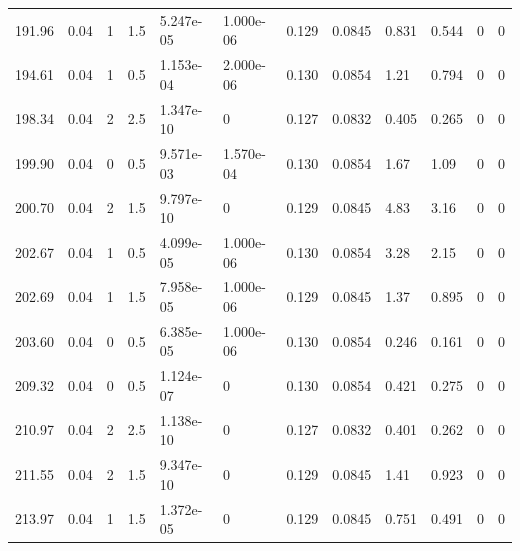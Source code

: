 \documentclass[preview]{standalone}
\begin{document}
{{{\begin{tabular}{L{1.2cm}C{1.2cm} C{0.3cm}C{0.5cm} C{1.4cm}C{1.4cm} C{1.4cm}C{1.4cm} C{1.6cm}C{1.6cm} C{1.6cm}C{1.6cm}}
  191.96  &  0.04  & 1     & 1.5 &  5.247e-05  & 1.000e-06  &  0.129&   0.0845& 0.831 & 0.544   &  0 & 0  \\ 
  194.61  &  0.04  & 1     & 0.5 &  1.153e-04  & 2.000e-06  &  0.130&   0.0854& 1.21 & 0.794   &  0 & 0  \\ 
  198.34  &  0.04  & 2     & 2.5 &  1.347e-10  & 0  &  0.127&   0.0832& 0.405 & 0.265   &  0 & 0  \\ 
  199.90  &  0.04  & 0     & 0.5 &  9.571e-03  & 1.570e-04  &  0.130&   0.0854& 1.67 & 1.09   &  0 & 0  \\ 
  200.70  &  0.04  & 2     & 1.5 &  9.797e-10  & 0  &  0.129&   0.0845& 4.83 & 3.16   &  0 & 0  \\ 
  202.67  &  0.04  & 1     & 0.5 &  4.099e-05  & 1.000e-06  &  0.130&   0.0854& 3.28 & 2.15   &  0 & 0  \\ 
  202.69  &  0.04  & 1     & 1.5 &  7.958e-05  & 1.000e-06  &  0.129&   0.0845& 1.37 & 0.895   &  0 & 0  \\ 
  203.60  &  0.04  & 0     & 0.5 &  6.385e-05  & 1.000e-06  &  0.130&   0.0854& 0.246 & 0.161   &  0 & 0  \\ 
  209.32  &  0.04  & 0     & 0.5 &  1.124e-07  & 0  &  0.130&   0.0854& 0.421 & 0.275   &  0 & 0  \\ 
  210.97  &  0.04  & 2     & 2.5 &  1.138e-10  & 0  &  0.127&   0.0832& 0.401 & 0.262   &  0 & 0  \\ 
  211.55  &  0.04  & 2     & 1.5 &  9.347e-10  & 0  &  0.129&   0.0845& 1.41 & 0.923   &  0 & 0  \\ 
  213.97  &  0.04  & 1     & 1.5 &  1.372e-05  & 0  &  0.129&   0.0845& 0.751 & 0.491   &  0 & 0  \\ 
\hline 
\end{tabular} 

}}}
\end{document}
